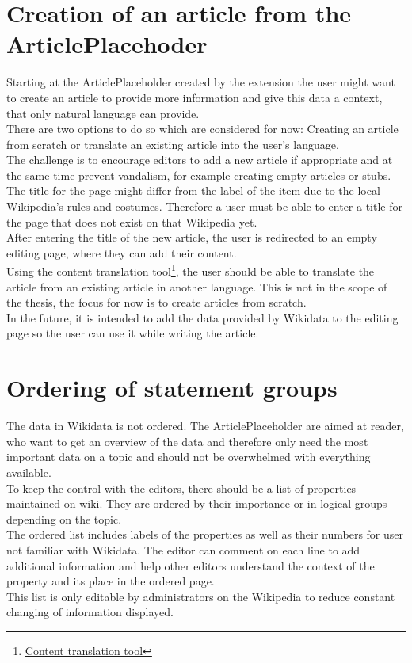 \section{Creation of an article from the ArticlePlacehoder}
Starting at the ArticlePlaceholder created by the extension the user might want to create an article to provide more information and give this data a context, that only natural language can provide. \\
There are two options to do so which are considered for now: Creating an article from scratch or translate an existing article into the user's language. \\
The challenge is to encourage editors to add a new article if appropriate and at the same time prevent vandalism, for example creating empty articles or stubs.\\ 
The title for the page might differ from the label of the item due to the local Wikipedia's rules and costumes. Therefore a user must be able to enter a title for the page that does not exist on that Wikipedia yet. \\
After entering the title of the new article, the user is redirected to an empty editing page, where they can add their content. \\
Using the content translation tool\footnote{\href{https://www.mediawiki.org/wiki/Content_translation}{Content translation tool}}, the user should be able to translate the article from an existing article in another language. This is not in the scope of the thesis, the focus for now is to create articles from scratch. \\
In the future, it is intended to add the data provided by Wikidata to the editing page so the user can use it while writing the article. 

\section{Ordering of statement groups}
The data in Wikidata is not ordered. The ArticlePlaceholder are aimed at reader, who want to get an overview of the data and therefore only need the most important data on a topic and should not be overwhelmed with everything available. 
\\
To keep the control with the editors, there should be a list of properties maintained on-wiki. They are ordered by their importance or in logical groups depending on the topic. \\
The ordered list includes labels of the properties as well as their numbers for user not familiar with Wikidata. The editor can comment on each line to add additional information and help other editors understand the context of the property and its place in the ordered page. \\
This list is only editable by administrators on the Wikipedia to reduce constant changing of information displayed. 

